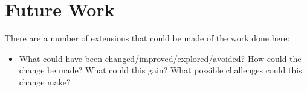 \section{Future Work}

There are a number of extensions that could be made of the work done here:

\begin{itemize}
  \item What could have been changed/improved/explored/avoided? 
    How could the change be made?
    What could this gain?
    What possible challenges could this change make?
\end{itemize}

